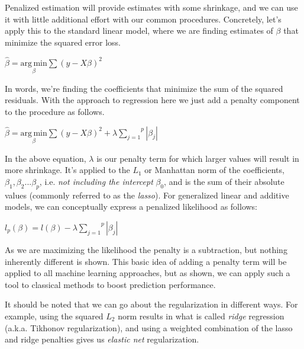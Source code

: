 \documentclass[english,nohyper,titlepage]{tufte-handout}\usepackage{knitr}
\begin{document}
Penalized estimation will provide estimates with some shrinkage, and we can use it with little additional effort with our common procedures.  Concretely, let's apply this to the standard linear model, where we are finding estimates of $\beta$ that minimize the squared error loss.

\vspace{.25cm}
$\hat\beta = \underset{\beta}{\mathrm{arg\, min}} \sum{(y-X\beta)^2}$ 
\vspace{.25cm}

In words, we're finding the coefficients that minimize the sum of the squared residuals.  With the approach to regression here we just add a penalty component to the procedure as follows.

\vspace{.25cm}
$\hat\beta = \underset{\beta}{\mathrm{arg\, min}} \sum{(y-X\beta)^2} + \lambda\overset{p}{\underset{j=1}{\sum}}{\left|\beta_j\right|}$ 
\vspace{.25cm}

%
In the above equation, $\lambda$ is our penalty term for which larger values will result in more shrinkage.  It's applied to the $L_1$ or Manhattan norm of the coefficients, $\beta_1,\beta_2...\beta_p$, i.e. \emph{not including the intercept} $\beta_0$, and is the sum of their absolute values (commonly referred to as the \emph{lasso}). For generalized linear and additive models, we can conceptually express a penalized likelihood as follows:

\vspace{.25cm}
$l_p(\beta) = l(\beta) - \lambda\overset{p}{\underset{j=1}{\sum}}{\left|\beta_j\right|}$ 
\vspace{.25cm}

As we are maximizing the likelihood the penalty is a subtraction, but nothing inherently different is shown.  This basic idea of adding a penalty term will be applied to all machine learning approaches, but as shown, we can apply such a tool to classical methods to boost prediction performance.

It should be noted that we can go about the regularization in different ways.  For example, using the squared $L_2$ norm results in what is called \emph{ridge} regression (a.k.a. Tikhonov regularization), and using a weighted combination of the lasso and ridge penalties gives us \emph{elastic net} regularization. 
\end{document}
